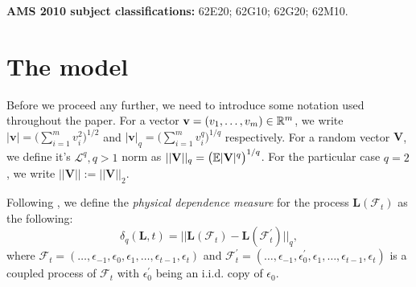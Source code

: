 \documentclass[a4paper,12pt]{article}
\begin{document}
\textbf{AMS 2010 subject classifications:} 62E20; 62G10; 62G20; 62M10. 

\vspace{-0.25cm}

\allowdisplaybreaks[1]

%

\section{The model}\label{sec-model}

Before we proceed any further, we need to introduce some notation used throughout the paper. For a vector $\mathbf{v} = (v_1, \ldots, v_m)\in\mathbb{R}^m$, we write $|\mathbf{v}| = \big(\sum_{i=1}^m v_i^2\big)^{1/2}$ and $|\mathbf{v}|_q = \big(\sum_{i=1}^m v_i^q\big)^{1/q}$ respectively. For a random vector $\mathbf{V}$, we define it's $\mathcal{L}^q, q>1$ norm as $||\mathbf{V}||_q = \big(\mathbb{E} |\mathbf{V}|^q\big)^{1/q}$. For the particular case $q = 2$, we write $||\mathbf{V}|| := ||\mathbf{V}||_2$.

Following \cite{Wu2005}, we define the \textit{physical dependence measure} for the process $\mathbf{L}(\mathcal{F}_t)$ as the following:
\[ \delta_q(\mathbf{L}, t) = || \mathbf{L}(\mathcal{F}_t) - \mathbf{L}(\mathcal{F}_t^\prime) ||_q,
\]
where $\mathcal{F}_t  = (\ldots, \epsilon_{-1}, \epsilon_0, \epsilon_1, \ldots, \epsilon_{t-1}, \epsilon_t)$ and $\mathcal{F}_t^\prime  = (\ldots, \epsilon_{-1}, \epsilon^\prime_0, \epsilon_1, \ldots, \epsilon_{t-1}, \epsilon_t)$ is a coupled process of $\mathcal{F}_t$ with $\epsilon_0^\prime$ being an i.i.d. copy of $\epsilon_0$.
\end{document}
